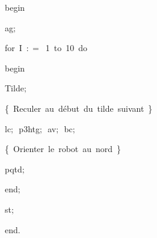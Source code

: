 {\vspace{\neglskip}\mbox{\blc  \idt  \mcl begin\idt }\par 
\vspace{\neglskip}\mbox{\blc  \blk\idt  ag$;$}\par 
\pagebreak[3] 
\vspace{\neglskip}\mbox{\blc  \blk\idt  \mcl for\idt \ I\ $:$$=$\ 1\ \mcl to\idt \ 10\ \mcl do\idt }\par 
\vspace{\neglskip}\mbox{\blc  \blk\blk\idt  \mcl begin\idt }\par 
\vspace{\neglskip}\mbox{\blc  \blk\blk\blk\idt  Tilde$;$}\par 
\vspace{\neglskip}\mbox{\blc  \blk\blk\blk\idt  \cmt  \{\ Reculer\ au\ début\ du\ tilde\ suivant\ \}\idt }\par 
\vspace{\neglskip}\mbox{\blc  \blk\blk\blk\idt  lc$;$\ p3htg$;$\ av$;$\ bc$;$}\par 
\vspace{\neglskip}\mbox{\blc  \blk\blk\blk\idt  \cmt  \{\ Orienter\ le\ robot\ au\ nord\ \}\idt }\par 
\vspace{\neglskip}\mbox{\blc  \blk\blk\blk\idt  pqtd$;$\ }\par 
\vspace{\neglskip}\mbox{\blc  \blk\blk\idt  \mcl end\idt $;$}\par 
\vspace{\neglskip}\mbox{\blc  \blk\idt  st$;$}\par 
\vspace{\neglskip}\mbox{\blc  \idt  \mcl end\idt $.$}\par 

\medskip }

